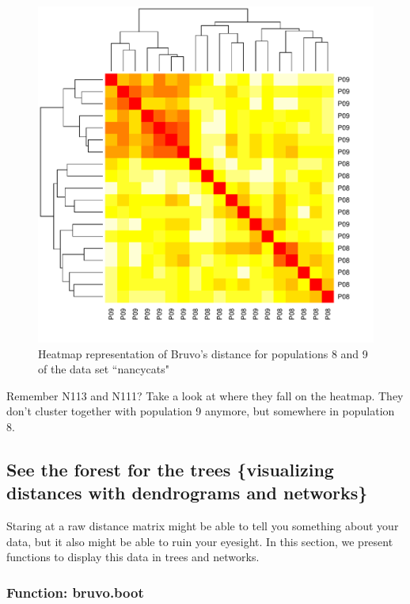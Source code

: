 \documentclass[letterpaper]{article}\usepackage[]{graphicx}\usepackage[]{color}
\newenvironment{knitrout}{}{} %
\newcommand{\tab}{\hspace*{1em}}
\begin{document}
\begin{figure}[h!]
  \centering
  \caption{\footnotesize Heatmap representation of Bruvo's distance for populations 8 and 9 of the data set ``nancycats"}
  \label{bruvo_heat_map_8to9}
\begin{knitrout}\footnotesize
{}\color{fgcolor}

{\centering \includegraphics[width=0.5\linewidth]{figure/popcompare_bruvo2} 

}



\end{knitrout}

\end{figure}

Remember N113 and N111? Take a look at where they fall on the heatmap. They don't cluster together with population 9 anymore, but somewhere in population 8.

\subsection{See the forest for the trees \{visualizing distances with dendrograms and networks\}}\label{index:trees}

\tab\tab Staring at a raw distance matrix might be able to tell you something about your data, but it also might be able to ruin your eyesight. In this section, we present functions to display this data in trees and networks. 

\subsubsection{Function: bruvo.boot}\label{index:trees:bruvo.boot}
\end{document}
